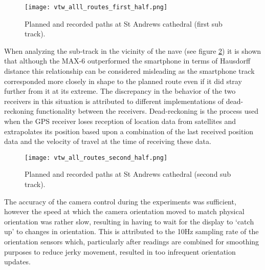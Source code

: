 \begin{figure}[h]
\centering
\texttt{[image: vtw\_alll\_routes\_first\_half.png]}
\caption{Planned and recorded paths at St Andrews cathedral (first sub track).}
\label{vtw_alll_routes_first_half.png}
\end{figure}

When analyzing the sub-track in the vicinity of the nave (see figure \ref{vtw_all_routes_second_half.png}) it is shown that although the MAX-6 outperformed the smartphone in terms of Hausdorff distance this relationship can be considered misleading as the smartphone track corresponded more closely in shape to the planned route even if it did stray further from it at its extreme. The discrepancy in the behavior of the two receivers in this situation is attributed to different implementations of dead-reckoning functionality between the receivers. Dead-reckoning is the process used when the GPS receiver loses reception of location data from satellites and extrapolates its position based upon a combination of the last received position data and the velocity of travel at the time of receiving these data.
 
\begin{figure}[h]
\centering
\texttt{[image: vtw\_all\_routes\_second\_half.png]}
\caption{Planned and recorded paths at St Andrews cathedral (second sub track).}
\label{vtw_all_routes_second_half.png}
\end{figure}


The accuracy of the camera control during the experiments was sufficient, however the speed at which the camera orientation moved to match physical orientation was rather slow, resulting in having to wait for the display to `catch up' to changes in orientation. This is attributed to the 10Hz sampling rate of the orientation sensors which, particularly after readings are combined for smoothing purposes to reduce jerky movement, resulted in too infrequent orientation updates.

